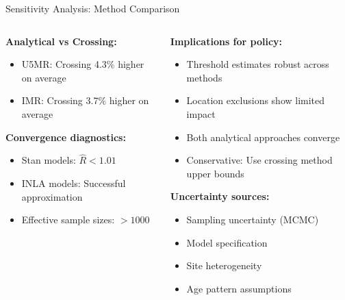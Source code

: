 \documentclass[aspectratio=169]{beamer}\usepackage[]{graphicx}\usepackage[dvipsnames]{xcolor}
\begin{document}
\begin{frame}{Sensitivity Analysis: Method Comparison}
\begin{columns}
\begin{column}{0.5\textwidth}
\textbf{Analytical vs Crossing:}
\begin{itemize}
\item U5MR: Crossing 4.3\% higher on average
\item IMR: Crossing 3.7\% higher on average
\end{itemize}


\vspace{0.3cm}
\textbf{Convergence diagnostics:}
\begin{itemize}
  \item Stan models: $\hat{R} < 1.01$
  \item INLA models: Successful approximation
  \item Effective sample sizes: $>1000$
\end{itemize}
\end{column}
\begin{column}{0.5\textwidth}
\textbf{Implications for policy:}
\begin{itemize}
  \item Threshold estimates robust across methods
  \item Location exclusions show limited impact
  \item Both analytical approaches converge
  \item Conservative: Use crossing method upper bounds
\end{itemize}

\vspace{0.3cm}
\textbf{Uncertainty sources:}
\begin{itemize}
  \item Sampling uncertainty (MCMC)
  \item Model specification
  \item Site heterogeneity  
  \item Age pattern assumptions
\end{itemize}
\end{column}
\end{columns}
\end{frame}
\end{document}
